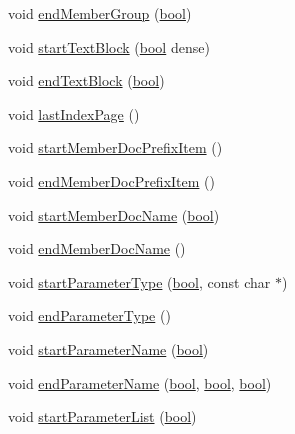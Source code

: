 \begin{DoxyCompactItemize}
\item 
void \hyperlink{class_r_t_f_generator_ab5e5ec2c8550abaeb2a55db71c88b37f}{end\+Member\+Group} (\hyperlink{qglobal_8h_a1062901a7428fdd9c7f180f5e01ea056}{bool})
\item 
void \hyperlink{class_r_t_f_generator_a7a31ccfd4c4f1392c8dfa3a08a6141d6}{start\+Text\+Block} (\hyperlink{qglobal_8h_a1062901a7428fdd9c7f180f5e01ea056}{bool} dense)
\item 
void \hyperlink{class_r_t_f_generator_a21fd75f623286b74383a3ad6579c022b}{end\+Text\+Block} (\hyperlink{qglobal_8h_a1062901a7428fdd9c7f180f5e01ea056}{bool})
\item 
void \hyperlink{class_r_t_f_generator_ab8e8c04376e00b1486850c8f76d01e85}{last\+Index\+Page} ()
\item 
void \hyperlink{class_r_t_f_generator_ad99cf6bdad8dcd97ed7179afdb78f2d1}{start\+Member\+Doc\+Prefix\+Item} ()
\item 
void \hyperlink{class_r_t_f_generator_a68512a40b063e43eba868aab90a993fc}{end\+Member\+Doc\+Prefix\+Item} ()
\item 
void \hyperlink{class_r_t_f_generator_a41596d84398c2606da472fca0ee74b9b}{start\+Member\+Doc\+Name} (\hyperlink{qglobal_8h_a1062901a7428fdd9c7f180f5e01ea056}{bool})
\item 
void \hyperlink{class_r_t_f_generator_acfea2f35d2c8a760082bc8ad6d0e18fc}{end\+Member\+Doc\+Name} ()
\item 
void \hyperlink{class_r_t_f_generator_a62b97ac9e8fb0b5b1f43258dab52a221}{start\+Parameter\+Type} (\hyperlink{qglobal_8h_a1062901a7428fdd9c7f180f5e01ea056}{bool}, const char $\ast$)
\item 
void \hyperlink{class_r_t_f_generator_afa91e226899991dfdc3996ee1f6f87c2}{end\+Parameter\+Type} ()
\item 
void \hyperlink{class_r_t_f_generator_adb57207e0840acb6350fef7e23604657}{start\+Parameter\+Name} (\hyperlink{qglobal_8h_a1062901a7428fdd9c7f180f5e01ea056}{bool})
\item 
void \hyperlink{class_r_t_f_generator_acc9e432934e2b1decdf1be6dbaa4f5f2}{end\+Parameter\+Name} (\hyperlink{qglobal_8h_a1062901a7428fdd9c7f180f5e01ea056}{bool}, \hyperlink{qglobal_8h_a1062901a7428fdd9c7f180f5e01ea056}{bool}, \hyperlink{qglobal_8h_a1062901a7428fdd9c7f180f5e01ea056}{bool})
\item 
void \hyperlink{class_r_t_f_generator_a2739446e6fe0e80105d5a0f010e46a6f}{start\+Parameter\+List} (\hyperlink{qglobal_8h_a1062901a7428fdd9c7f180f5e01ea056}{bool})
\item 

\end{DoxyCompactItemize}
